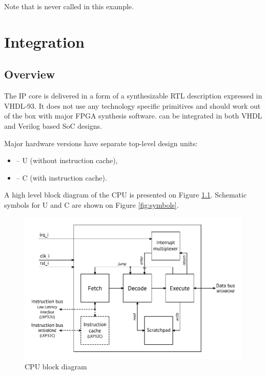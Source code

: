 \documentclass[a4paper,12pt,twoside,extrafontsizes]{memoir}
\begin{document}
Note that  is never called in this example.

\chapter{Integration}
\label{ch:integration}

\section{Overview}

The \lxp{} IP core is delivered in a form of a synthesizable RTL description expressed in \mbox{VHDL-93}. It does not use any technology specific primitives and should work out of the box with major FPGA synthesis software. \lxp{} can be integrated in both VHDL and Verilog\textregistered{} based SoC designs.

Major \lxp{} hardware versions have separate top-level design units:

\begin{itemize}
	\item {} -- \lxp{}U (without instruction cache),
	\item {} -- \lxp{}C (with instruction cache).
\end{itemize}

A high level block diagram of the CPU is presented on Figure \ref{fig:blockdiagram}. Schematic symbols for \lxp{}U and \lxp{}C are shown on Figure \ref{fig:symbols}.

\begin{figure}[htbp]
	\centering
	\includegraphics[scale=0.85]{images/blockdiagram.pdf}
	\caption{\lxp{} CPU block diagram}
	\label{fig:blockdiagram}
\end{figure}
\end{document}
